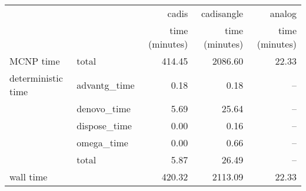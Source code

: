 \begin{tabular}{llrrr}
\toprule
          &              &          cadis &     cadisangle &         analog \\
          &              & time (minutes) & time (minutes) & time (minutes) \\
\midrule
MCNP time & total &         414.45 &        2086.60 &          22.33 \\
deterministic time & advantg\_time &           0.18 &           0.18 &            -- \\
          & denovo\_time &           5.69 &          25.64 &            -- \\
          & dispose\_time &           0.00 &           0.16 &            -- \\
          & omega\_time &           0.00 &           0.66 &            -- \\
          & total &           5.87 &          26.49 &            -- \\
wall time &              &         420.32 &        2113.09 &          22.33 \\
\bottomrule
\end{tabular}
